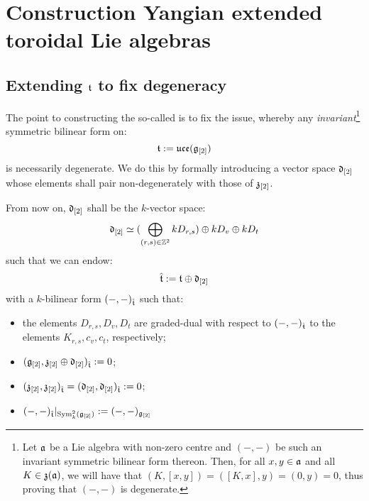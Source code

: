 \section{Construction Yangian extended toroidal Lie algebras}
    \subsection{Extending \texorpdfstring{$\mathfrak{t}$}{} to fix degeneracy}
        The point to constructing the so-called  is to fix the issue, whereby any \textit{invariant}\footnote{Let $\mathfrak{a}$ be a Lie algebra with non-zero centre and $(-, -)$ be such an invariant symmetric bilinear form thereon. Then, for all $x, y \in \mathfrak{a}$ and all $K \in \mathfrak{z}(\mathfrak{a})$, we will have that $(K, [x, y]) = ([K, x], y) = (0, y) = 0$, thus proving that $(-, -)$ is degenerate.} symmetric bilinear form on:
            $$\mathfrak{t}:= \mathfrak{uce}(\mathfrak{g}_{[2]})$$
        is necessarily degenerate. We do this by formally introducing a  vector space $\mathfrak{d}_{[2]}$ whose elements shall pair non-degenerately with those of $\mathfrak{z}_{[2]}$. 
        \begin{convention} \label{conv: orthogonal_complement_of_toroidal_centres}
            From now on, $\mathfrak{d}_{[2]}$ shall be the $k$-vector space:
                $$\mathfrak{d}_{[2]} \simeq ( \bigoplus_{(r, s) \in \mathbb{Z}^2} k D_{r, s} ) \oplus k D_v \oplus k D_t$$
            such that we can endow:
                $$\hat{\mathfrak{t}} := \mathfrak{t}\oplus \mathfrak{d}_{[2]}$$
            with a $k$-bilinear form $(-, -)_{\hat{\mathfrak{t}}}$ such that:
            \begin{itemize}
                \item the elements $D_{r, s}, D_v, D_t$ are graded-dual with respect to $(-, -)_{\hat{\mathfrak{t}}}$ to the elements $K_{r, s}, c_v, c_t$, respectively;
                \item $(\mathfrak{g}_{[2]}, \mathfrak{z}_{[2]} \oplus \mathfrak{d}_{[2]})_{\hat{\mathfrak{t}}} := 0$;
                \item $(\mathfrak{z}_{[2]}, \mathfrak{z}_{[2]})_{\hat{\mathfrak{t}}} = (\mathfrak{d}_{[2]}, \mathfrak{d}_{[2]})_{\hat{\mathfrak{t}}} := 0$;
                \item $(-, -)_{\hat{\mathfrak{t}}}|_{\mathrm{Sym}^2_{k}(\mathfrak{g}_{[2]})} := (-, -)_{\mathfrak{g}_{[2]}}$
            \end{itemize}
        \end{convention}
